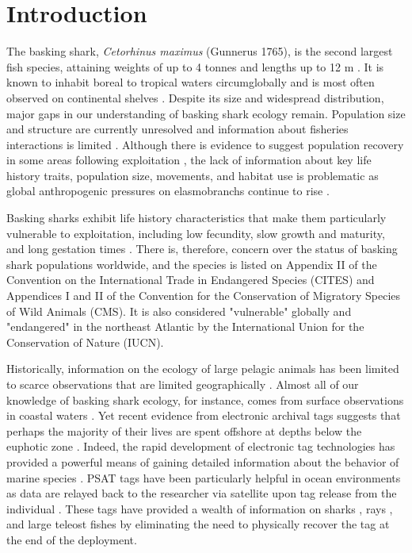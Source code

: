 \section{Introduction}
The basking shark, \textit{Cetorhinus maximus} (Gunnerus 1765), is the second largest fish species, attaining weights of up to 4 tonnes and lengths up to 12 m \citep{Sims2008}. It is known to inhabit boreal to tropical \citep{Skomal2009} waters circumglobally and is most often observed on continental shelves \citep{Sims2006}. Despite its size and widespread distribution, major gaps in our understanding of basking shark ecology remain. Population size and structure are currently unresolved and information about fisheries interactions is limited \citep{Sims2008}. Although there is evidence to suggest population recovery in some areas following exploitation \citep{Witt2012}, the lack of information about key life history traits, population size, movements, and habitat use is problematic as global anthropogenic pressures on elasmobranchs continue to rise \citep{Dulvy2008, Ferretti2010}.

Basking sharks exhibit life history characteristics that make them particularly vulnerable to exploitation, including low fecundity, slow growth and maturity, and long gestation times \citep{Compagno1984, Sims2008}. There is, therefore, concern over the status of basking shark populations worldwide, and the species is listed on Appendix II of the Convention on the International Trade in Endangered Species (CITES) and Appendices I and II of the Convention for the Conservation of Migratory Species of Wild Animals (CMS). It is also considered "vulnerable" globally and "endangered" in the northeast Atlantic by the International Union for the Conservation of Nature (IUCN).

Historically, information on the ecology of large pelagic animals has been limited to scarce observations that are limited geographically \citep{Templeman1963, SquireJr1990, Francis2002}. Almost all of our knowledge of basking shark ecology, for instance, comes from surface observations in coastal waters \citep{Sims2006, Sims2008}.  Yet recent evidence from electronic archival tags suggests that perhaps the majority of their lives are spent offshore at depths below the euphotic zone \citep{Skomal2009}. Indeed, the rapid development of electronic tag technologies has provided a powerful means of gaining detailed information about the behavior of marine species \citep{Block2011}. PSAT tags have been particularly helpful in ocean environments as data are relayed back to the researcher via satellite upon tag release from the individual \citep[\emph{e.g.}][]{Block2011}. These tags have provided a wealth of information on sharks \citep{Werry2014, Berumen2014}, rays \citep{Braun2014, Thorrold2014}, and large teleost fishes \citep{Braun2015} by eliminating the need to physically recover the tag at the end of the deployment. 

